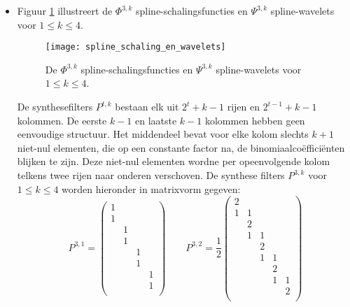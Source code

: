 \begin{enumerate}
			
	{
		\begin{itemize} 
			\item Figuur \ref{fig:spline_schaling_wavelet} illustreert de $\Phi^{3, k}$ spline-schalingsfuncties en $\Psi^{3, k}$ spline-wavelets voor  $1 \leq k \leq 4$.
			\begin{figure}[ht]
				\centering
				\texttt{[image: spline\_schaling\_en\_wavelets]}
				\caption{De $\Phi^{3, k}$ spline-schalingsfuncties en $\Psi^{3, k}$ spline-wavelets voor $1 \leq k \leq 4$.}
				\label{fig:spline_schaling_wavelet}
			\end{figure}
			De synthesefilters $P^{t, k}$ bestaan elk uit $2^t + k -1$ rijen en $2^{t - 1} + k - 1$ kolommen. De eerste $k-1$ en laatste $k-1$ kolommen hebben geen eenvoudige structuur. Het middendeel bevat voor elke kolom slechts $k + 1$ niet-nul elementen, die op een constante factor na, de binomiaalcoëfficiënten blijken te zijn. Deze niet-nul elementen wordne per opeenvolgende kolom telkens twee rijen naar onderen verschoven. De synthese filters $P^{3, k}$ voor $1 \leq k \leq 4$ worden hieronder in matrixvorm gegeven:
			$$
			P^{3, 1} = 
			\begin{pmatrix}
				1 &   &   &   \\
				1 &   &   &   \\
				  & 1 &   &   \\
				  & 1 &   &   \\
				  &   & 1 &   \\
				  &   & 1 &  \\
				  &   &   & 1 \\
				  &   &   & 1 \\
			\end{pmatrix}
			\qquad
			P^{3, 2} = \frac{1}{2}
			\begin{pmatrix}
				2 &   &   &   & \\
				1 & 1 &   &   & \\
				  & 2 &   &   & \\
				  & 1 & 1 &   & \\
				  &   & 2 &   & \\
				  &   & 1 & 1 & \\
				  &   &   & 2 & \\
				  &   &   & 1 & 1\\
				  &   &   &   & 2\\

\end{pmatrix}$$
\end{itemize}}
\end{enumerate}
